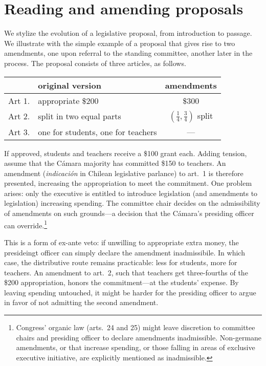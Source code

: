 \documentclass[letter,12pt]{article}
\begin{document}
\section{Reading and amending proposals}

We stylize the evolution of a legislative proposal, from introduction to passage. We illustrate with the simple example of a proposal that gives rise to two amendments, one upon referral to the standing committee, another later in the process. The proposal consists of three articles, as follows. 

\begin{center}
\noindent \begin{tabular}{llc}
       & original version                   & amendments                                       \\ \hline
Art 1. & appropriate \$200                  & \$300                                            \\
Art 2. & split in two equal parts           & $(\frac{1}{4}, \frac{3}{4})$ split \\
Art 3. & one for students, one for teachers & ---                                              \\
\end{tabular}
\end{center}

\noindent If approved, students and teachers receive a \$100 grant each. Adding tension, assume that the C\'amara majority has committed \$150 to teachers. An amendment (\emph{indicación} in Chilean legislative  parlance) to art.\ 1 is therefore presented, increasing the appropriation to meet the commitment. One problem arises: only the executive is entitled to introduce legislation (and amendments to legislation) increasing spending. The committee chair decides on the admissibility of amendments on such grounds---a decision that the C\'amara's presiding officer can override.\footnote{Congress' organic law (arts.\ 24 and 25) might leave discretion to committee chairs and presiding officer to declare amendments inadmissible. Non-germane amendments, or that increase spending, or those falling in areas of exclusive executive initiative, are explicitly mentioned as inadmissible.} 

This is a form of ex-ante veto: if unwilling to appropriate extra money, the presideingt officer can simply declare the amendment inadmissibile. In which case, the distributive route remains practicable: less for students, more for teachers. An amendment to art.\ 2, such that teachers get three-fourths of the \$200 appropriation, honors the commitment---at the students' expense. By leaving spending untouched, it might be harder for the presiding officer to argue in favor of not admitting the second amendment. 
\end{document}
